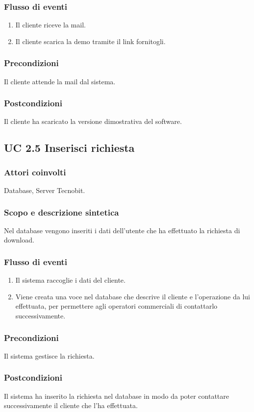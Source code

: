 \subsubsection*{Flusso di eventi}
\begin{enumerate}
\item Il cliente riceve la mail.
\item Il cliente scarica la demo tramite il link fornitogli.
\end{enumerate}
\subsubsection*{Precondizioni} Il cliente attende la mail dal sistema.
\subsubsection*{Postcondizioni} Il cliente ha scaricato la versione dimostrativa del software.

\subsection*{UC 2.5 Inserisci richiesta}
\subsubsection*{Attori coinvolti}  
Database, Server Tecnobit. 
\subsubsection*{Scopo e descrizione sintetica}
Nel database vengono inseriti i dati dell'utente che ha effettuato la richiesta di download. 
\subsubsection*{Flusso di eventi}
\begin{enumerate}
\item Il sistema raccoglie i dati del cliente.
\item Viene creata una voce nel database che descrive il cliente e l'operazione da lui effettuata, per permettere agli 
operatori commerciali di contattarlo successivamente.
\end{enumerate}
\subsubsection*{Precondizioni} Il sistema gestisce la richiesta.
\subsubsection*{Postcondizioni} Il sistema ha inserito la richiesta nel database in modo da poter contattare successivamente il cliente che l'ha effettuata.

